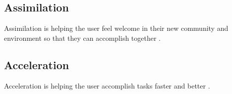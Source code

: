 \subsection{Assimilation}
Assimilation is helping the user feel welcome in their new community and environment so that they can accomplish together \cite{Bradt2009}.

\subsection{Acceleration}
Acceleration is helping the user accomplish tasks faster and better \cite{Bradt2009}.

